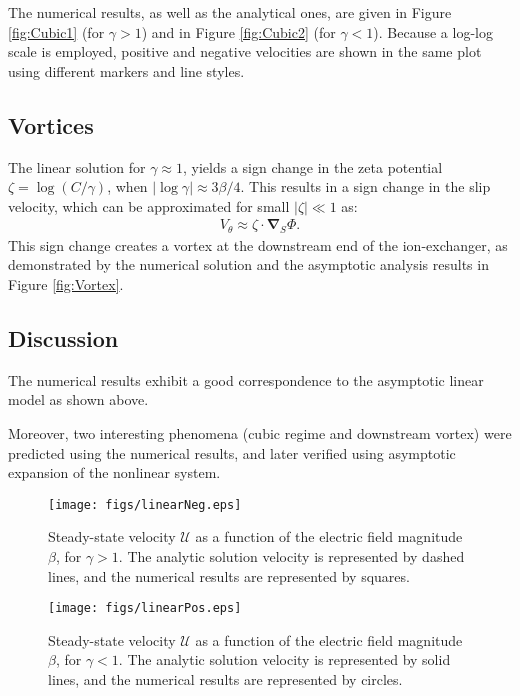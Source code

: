 \documentclass[final]{elsarticle}
\newcommand\bnabla{\boldsymbol{\nabla}}
\newcommand\cU{\mathscr{U}}
\begin{document}
The numerical results, as well as the analytical ones, are given in Figure
\ref{fig:Cubic1} (for $\gamma > 1$) and in Figure \ref{fig:Cubic2} (for $\gamma < 1$).
Because a log-log scale is employed, positive and negative velocities are shown in
the same plot using different markers and line styles.

\subsection{Vortices}
The linear solution for $\gamma \approx 1$, 
yields a sign change in the zeta potential $\zeta = \log (C/\gamma)$, when
$|\log\gamma| \approx 3\beta / 4$. This results in a sign change in the slip velocity,
which can be approximated for small $|\zeta| \ll 1$ as:
\begin{eqnarray*}
V_\theta \approx \zeta \cdot \bnabla_S \varPhi.
\end{eqnarray*} 
This sign change creates a vortex at the downstream end of the ion-exchanger, 
as demonstrated by the numerical solution and the asymptotic analysis results 
in Figure \ref{fig:Vortex}.

\subsection{Discussion}
The numerical results exhibit a good correspondence to the asymptotic linear model as
shown above.

Moreover, two interesting phenomena (cubic regime and downstream vortex) were predicted
using the numerical results, and later verified using asymptotic expansion of the
nonlinear system.


\begin{figure}[htbp]
    \begin{center}
    \texttt{[image: figs/linearNeg.eps]}
    \caption{Steady-state velocity $\cU$ as a function of the 
        electric field magnitude $\beta$, for $\gamma > 1$. 
        The analytic solution velocity is represented by dashed lines, and the numerical
        results are represented by squares.}
    \label{fig:Linear1}
    \end{center}
\end{figure}

\begin{figure}[htbp]
    \begin{center}
    \texttt{[image: figs/linearPos.eps]}
    \caption{Steady-state velocity $\cU$ as a function of the 
        electric field magnitude $\beta$, for $\gamma < 1$. 
        The analytic solution velocity is represented by solid lines, and the numerical
        results are represented by circles.}
    \label{fig:Linear2}
    \end{center}
\end{figure}
\end{document}
